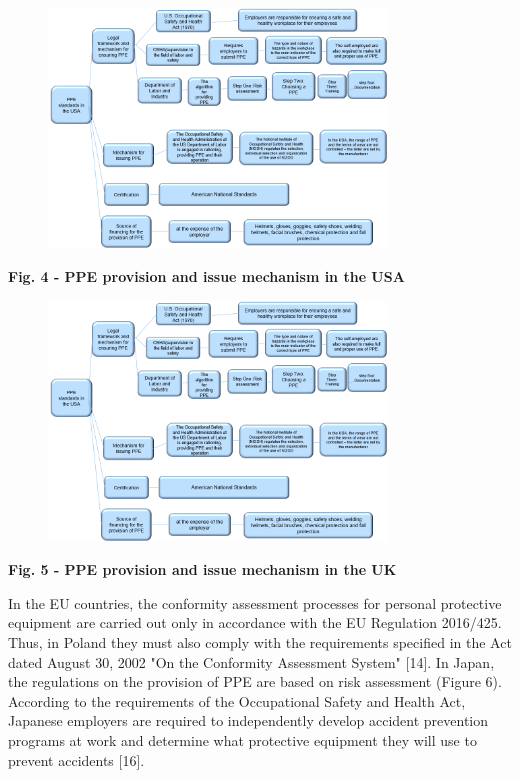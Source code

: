 {\begin{figure}[H]
	\centering
	\includegraphics[width=0.8\textwidth]{media/chem2/image5}
	\caption*{}
\end{figure}


{\bfseries Fig. 4 - PPE provision and issue mechanism in the USA}

\begin{figure}[H]
	\centering
	\includegraphics[width=0.8\textwidth]{media/chem2/image5}
	\caption*{}
\end{figure}


{\bfseries Fig. 5 - PPE provision and issue mechanism in the UK}

In the EU countries, the conformity assessment processes for personal
protective equipment are carried out only in accordance with the EU
Regulation 2016/425. Thus, in Poland they must also comply with the
requirements specified in the Act dated August 30, 2002 "On the
Conformity Assessment System" {[}14{]}. In Japan, the regulations on the
provision of PPE are based on risk assessment (Figure 6). According to
the requirements of the Occupational Safety and Health Act, Japanese
employers are required to independently develop accident prevention
programs at work and determine what protective equipment they will use
to prevent accidents {[}16{]}.

}
